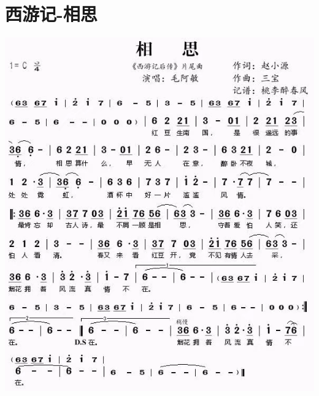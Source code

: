 \documentclass[cn,pad,twocol]{elegantbook}
\begin{document}
\section{西游记-相思}\includegraphics[width=\textwidth]{dongxiao/20200819/西游记-相思.png}
\end{document}
